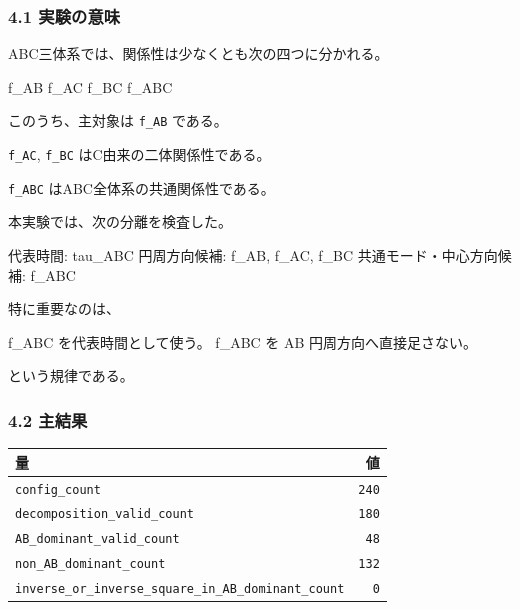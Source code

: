\documentclass[
]{article}
\newenvironment{Shaded}{}{}
\newcommand{\NormalTok}[1]{#1}
\newcounter{none} %
\begin{document}
\subsubsection{4.1 実験の意味}\label{ux5b9fux9a13ux306eux610fux5473-2}

ABC三体系では、関係性は少なくとも次の四つに分かれる。

\begin{Shaded}
\begin{Highlighting}[]
\NormalTok{f\_AB}
\NormalTok{f\_AC}
\NormalTok{f\_BC}
\NormalTok{f\_ABC}
\end{Highlighting}
\end{Shaded}

このうち、主対象は \texttt{f\_AB} である。

\texttt{f\_AC}, \texttt{f\_BC} はC由来の二体関係性である。

\texttt{f\_ABC} はABC全体系の共通関係性である。

本実験では、次の分離を検査した。

\begin{Shaded}
\begin{Highlighting}[]
\NormalTok{代表時間: tau\_ABC}
\NormalTok{円周方向候補: f\_AB, f\_AC, f\_BC}
\NormalTok{共通モード・中心方向候補: f\_ABC}
\end{Highlighting}
\end{Shaded}

特に重要なのは、

\begin{Shaded}
\begin{Highlighting}[]
\NormalTok{f\_ABC を代表時間として使う。}
\NormalTok{f\_ABC を AB 円周方向へ直接足さない。}
\end{Highlighting}
\end{Shaded}

という規律である。

\subsubsection{4.2 主結果}\label{ux4e3bux7d50ux679c-2}

{\def\LTcaptype{none} %
\begin{longtable}[]{@{}lr@{}}
\toprule\noalign{}
量 & 値 \\
\midrule\noalign{}
\endhead
\bottomrule\noalign{}
\endlastfoot
\texttt{config\_count} & \texttt{240} \\
\texttt{decomposition\_valid\_count} & \texttt{180} \\
\texttt{AB\_dominant\_valid\_count} & \texttt{48} \\
\texttt{non\_AB\_dominant\_count} & \texttt{132} \\
\texttt{inverse\_or\_inverse\_square\_in\_AB\_dominant\_count} &
\texttt{0} \\
\end{longtable}
}
\end{document}
